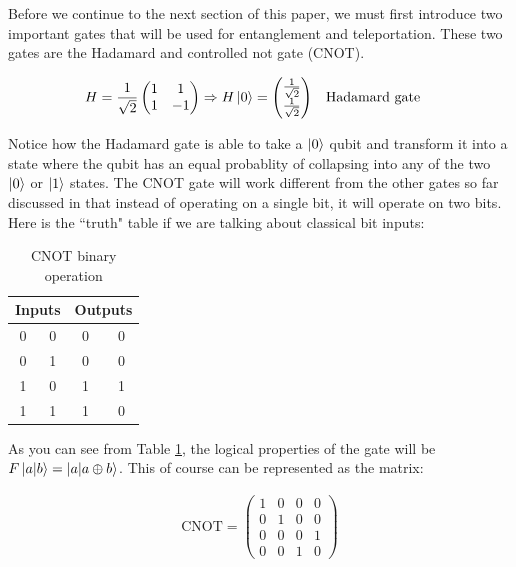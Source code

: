 \documentclass[conference]{IEEEtran}
\begin{document}
Before we continue to the next section of this paper, we must first introduce two important gates that will be used for entanglement and teleportation. These two gates are the Hadamard and controlled not gate (CNOT).

\begin{align*}
H = \frac{1}{\sqrt{2}}\begin{pmatrix}
	1 & 1\\
	1 & -1
\end{pmatrix} \Rightarrow H \ket{0} &= \begin{pmatrix}
	\frac{1}{\sqrt{2}}\\
	\frac{1}{\sqrt{2}}
\end{pmatrix} && \text{Hadamard gate}
\end{align*}

Notice how the Hadamard gate is able to take a $\ket{0}$ qubit and transform it into a state where the qubit has an equal probablity of collapsing into any of the two $\ket{0}$ or $\ket{1}$ states. The CNOT gate will work different from the other gates so far discussed in that instead of operating on a single bit, it will operate on two bits. Here is the ``truth" table if we are talking about classical bit inputs:

\begin{table}[htbp]
\caption{CNOT binary operation}
\begin{center}
\begin{tabular}{|c|c||c|c|}
\hline
\multicolumn{2}{|c||}{\textbf{Inputs}} & \multicolumn{2}{c|}{\textbf{Outputs}}\\\hline
0 & 0 & 0 & 0 \\\hline
0 & 1 & 0 & 0 \\\hline
1 & 0 & 1 & 1 \\\hline
1 & 1 & 1 & 0 \\\hline
\end{tabular}
\label{tab:cnot}
\end{center}
\end{table}

As you can see from Table \ref{tab:cnot}, the logical properties of the gate will be $F\ket{a|b} = \ket{a|a \oplus b}$. This of course can be represented as the matrix:

\begin{align*}
\text{CNOT} = \begin{pmatrix}
	1 & 0 & 0 & 0\\
	0 & 1 & 0 & 0\\
	0 & 0 & 0 & 1\\
	0 & 0 & 1 & 0
\end{pmatrix}
\end{align*}
\end{document}
